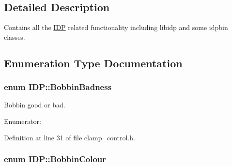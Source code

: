 \subsection{Detailed Description}
Contains all the \hyperlink{namespaceIDP}{IDP} related functionality including libidp and some idpbin classes. 

\subsection{Enumeration Type Documentation}
\hypertarget{namespaceIDP_adf12b2c1e1c228810b18c34a3c88c32d}{
\subsubsection[{BobbinBadness}]{\setlength{\rightskip}{0pt plus 5cm}enum {\bf IDP::BobbinBadness}}}
\label{namespaceIDP_adf12b2c1e1c228810b18c34a3c88c32d}


Bobbin good or bad. 

\begin{Desc}
\item[Enumerator: ]\par
\begin{description}
\item[{\em 
\hypertarget{namespaceIDP_adf12b2c1e1c228810b18c34a3c88c32dafdc1b8b5a9d849fd99ac2ae438b632dd}{
BOBBIN\_\-GOOD}
\label{namespaceIDP_adf12b2c1e1c228810b18c34a3c88c32dafdc1b8b5a9d849fd99ac2ae438b632dd}
}]\item[{\em 
\hypertarget{namespaceIDP_adf12b2c1e1c228810b18c34a3c88c32da6cb4993a316e9d4dc9836d3d990fd0f6}{
BOBBIN\_\-BAD}
\label{namespaceIDP_adf12b2c1e1c228810b18c34a3c88c32da6cb4993a316e9d4dc9836d3d990fd0f6}
}]\end{description}
\end{Desc}



Definition at line 31 of file clamp\_\-control.h.

\hypertarget{namespaceIDP_a6efd2cca14c0dae1c6458714ce0218df}{
\subsubsection[{BobbinColour}]{\setlength{\rightskip}{0pt plus 5cm}enum {\bf IDP::BobbinColour}}}
\label{namespaceIDP_a6efd2cca14c0dae1c6458714ce0218df}



